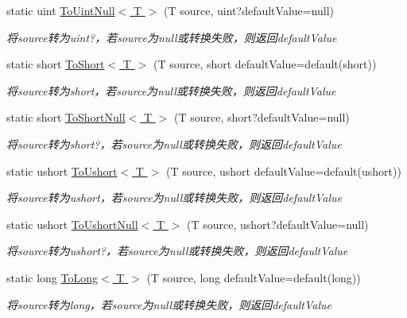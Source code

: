 \begin{DoxyCompactItemize}
static uint \hyperlink{class_x_c_l_net_tools_1_1_common_1_1_data_type_convert_ad25cb7c5c7757758ab91f2c006fcd4fa}{To\+Uint\+Null$<$ T $>$} (T source, uint?default\+Value=null)
\begin{DoxyCompactList}\small\item\em 将source转为uint?，若source为null或转换失败，则返回default\+Value \end{DoxyCompactList}\item 
static short \hyperlink{class_x_c_l_net_tools_1_1_common_1_1_data_type_convert_a2f311afdf05703ddfc64d2c897d39e1f}{To\+Short$<$ T $>$} (T source, short default\+Value=default(short))
\begin{DoxyCompactList}\small\item\em 将source转为short，若source为null或转换失败，则返回default\+Value \end{DoxyCompactList}\item 
static short \hyperlink{class_x_c_l_net_tools_1_1_common_1_1_data_type_convert_a0d6fbd193a532895a3acdaac21b25260}{To\+Short\+Null$<$ T $>$} (T source, short?default\+Value=null)
\begin{DoxyCompactList}\small\item\em 将source转为short?，若source为null或转换失败，则返回default\+Value \end{DoxyCompactList}\item 
static ushort \hyperlink{class_x_c_l_net_tools_1_1_common_1_1_data_type_convert_ae848ec8ce2c88dc9ee801ed64e761ca3}{To\+Ushort$<$ T $>$} (T source, ushort default\+Value=default(ushort))
\begin{DoxyCompactList}\small\item\em 将source转为ushort，若source为null或转换失败，则返回default\+Value \end{DoxyCompactList}\item 
static ushort \hyperlink{class_x_c_l_net_tools_1_1_common_1_1_data_type_convert_ad1d6c049665fe1be5a104f92c976d02e}{To\+Ushort\+Null$<$ T $>$} (T source, ushort?default\+Value=null)
\begin{DoxyCompactList}\small\item\em 将source转为ushort?，若source为null或转换失败，则返回default\+Value \end{DoxyCompactList}\item 
static long \hyperlink{class_x_c_l_net_tools_1_1_common_1_1_data_type_convert_a0fb66f094f40b602918778139b4cc9df}{To\+Long$<$ T $>$} (T source, long default\+Value=default(long))
\begin{DoxyCompactList}\small\item\em 将source转为long，若source为null或转换失败，则返回default\+Value \end{DoxyCompactList}\item 

\end{DoxyCompactItemize}
